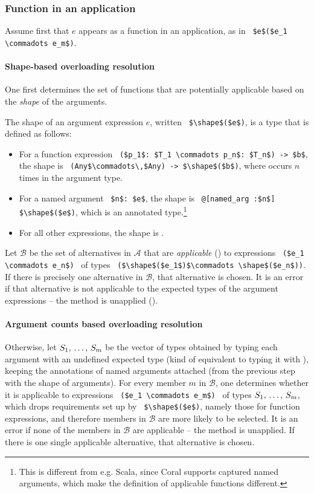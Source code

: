 \subsubsection{Function in an application}

Assume first that $e$ appears as a function in an application, as in ~\lstinline!$e$($e_1 \commadots e_m$)!.

\paragraph{Shape-based overloading resolution}
One first determines the set of functions that are potentially applicable based on the {\em shape} of the arguments. 

The shape of an argument expression $e$, written ~\lstinline!$\shape$($e$)!, is a type that is defined as follows:
\begin{itemize}
\item For a function expression ~\lstinline!($p_1$: $T_1 \commadots p_n$: $T_n$) -> $b$!, the shape is ~\lstinline!(Any$\commadots\,$Any) -> $\shape$($b$)!, where  occurs $n$ times in the argument type. 
\item For a named argument ~\lstinline!$n$: $e$!, the shape is ~\lstinline!@[named_arg :$n$] $\shape$($e$)!, which is an annotated type.\footnote{This is different from e.g. Scala, since Coral supports captured named arguments, which make the definition of applicable functions different.} %
\item For all other expressions, the shape is . 
\end{itemize}

Let $\mathcal{B}$ be the set of alternatives in $\mathcal{A}$ that are {\em applicable} () to expressions ~\lstinline!($e_1 \commadots e_n$)!~ of types ~\lstinline!($\shape$($e_1$)$\commadots \shape$($e_n$))!. If there is precisely one alternative in $\mathcal{B}$, that alternative is chosen. It is an error if that alternative is not applicable to the expected types of the argument expressions -- the method is unapplied (). 

\paragraph{Argument counts based overloading resolution}
Otherwise, let $S_1 ,\, \ldots ,\, S_m$ be the vector of types obtained by typing each argument with an undefined expected type (kind of equivalent to typing it with ), keeping the annotations of named arguments attached (from the previous step with the shape of arguments). For every member $m$ in $\mathcal{B}$, one determines whether it is applicable to expressions ~\lstinline!($e_1 \commadots e_m$)!~ of types $S_1 ,\, \ldots ,\, S_m$, which drops requirements set up by ~\lstinline!$\shape$($e$)!, namely those for function expressions, and therefore members in $\mathcal{B}$ are more likely to be selected. It is an error if none of the members in $\mathcal{B}$ are applicable -- the method is unapplied. If there is one single applicable alternative, that alternative is chosen. 

